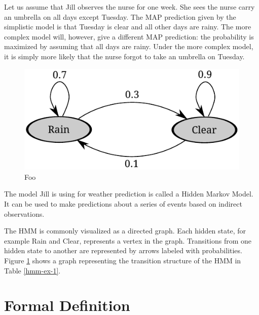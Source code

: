 Let us assume that Jill observes the nurse for one week. She sees the
nurse carry an umbrella on all days except Tuesday. The MAP prediction
given by the simplistic model is that Tuesday is clear and all other
days are rainy. The more complex model will, however, give a different
MAP prediction: the probability is maximized by assuming that all days
are rainy. Under the more complex model, it is simply more likely that
the nurse forgot to take an umbrella on Tuesday.

\begin{figure}[!htb]
\begin{center}
\caption{Foo}\label{hmm-ex-2}
\includegraphics[scale=0.8]{hmm-ex-graph}
\end{center}
\end{figure}

The model Jill is using for weather prediction is called a Hidden
Markov Model. It can be used to make predictions about a series of
events based on indirect observations. 

The HMM is commonly visualized as a directed graph. Each hidden state,
for example Rain and Clear, represents a vertex in the
graph. Transitions from one hidden state to another are represented by
arrows labeled with probabilities. Figure \ref{hmm-ex-2} shows a graph
representing the transition structure of the HMM in Table
\ref{hmm-ex-1}.

\section{Formal Definition}


